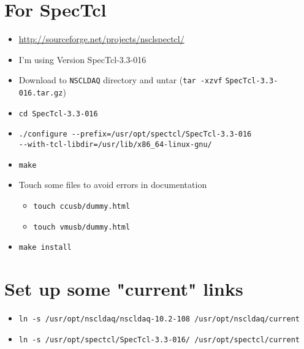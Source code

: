 \documentclass[11pt]{article}
\begin{document}
\section*{For SpecTcl}
\label{sec-4}
\begin{itemize}
\item \url{http://sourceforge.net/projects/nsclspectcl/}
\item I'm using Version SpecTcl-3.3-016
\item Download to \verb~NSCLDAQ~ directory and untar (\verb~tar -xzvf~
    \verb~SpecTcl-3.3-016.tar.gz~)
\item \verb~cd SpecTcl-3.3-016~
\item \verb~./configure --prefix=/usr/opt/spectcl/SpecTcl-3.3-016~\\
    \verb~--with-tcl-libdir=/usr/lib/x86_64-linux-gnu/~
\item \verb~make~
\item Touch some files to avoid errors in documentation
\begin{itemize}
\item \verb~touch ccusb/dummy.html~
\item \verb~touch vmusb/dummy.html~
\end{itemize}
\item \verb~make install~
\end{itemize}
\section*{Set up some "current" links}
\label{sec-5}
\begin{itemize}
\item \verb~ln -s /usr/opt/nscldaq/nscldaq-10.2-108 /usr/opt/nscldaq/current~
\item \verb~ln -s /usr/opt/spectcl/SpecTcl-3.3-016/ /usr/opt/spectcl/current~
\end{itemize}
\end{document}
